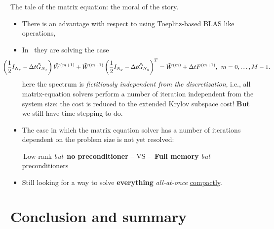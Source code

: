 \documentclass[aspectratio=169,xcolor=dvipsnames]{beamer}
\begin{document}
\begin{frame}{\Large The tale of the matrix equation: the moral of the story.}

\begin{itemize}
	\item[\faClock]<1-> There is an advantage with respect to using Toeplitz-based BLAS like operations,
	\item[\faForward]<2-> In~\parencite{MR3995304} they are solving the case
	\[\hspace{-3.2em}
	\left( \frac{1}{2} I_{N_x} - \Delta t \tilde{G}_{N_x} \right) \tilde{W}^{(m+1)} + \tilde{W}^{(m+1)} \left( \frac{1}{2} I_{N_y} - \Delta t \tilde{G}_{N_y} \right)^T = \tilde{W}^{(m)} + \Delta t F^{(m+1)}, \;\, m=0,\ldots,M-1.
	\]
	here the spectrum is \emph{fictitiously independent from the discretization}, i.e., all matrix-equation solvers perform a number of iteration independent from the system size: the cost is reduced to the extended Krylov subspace cost! \alert{\textbf{But}} we still have time-stepping to do.
	\item[\faQuestionCircle]<3-> The case in which the matrix equation solver has a number of iterations dependent on the problem size is not yet resolved:
	\begin{center}
		\faSmile\,Low-rank \emph{but} \alert{\textbf{\faSadCry\,no preconditioner}} -- VS -- \alert{\textbf{\faSadCry\,Full memory}} \emph{but} \faSmile\,preconditioners
	\end{center}
	\item[\faExclamation]<4-> Still looking for a way to solve \textbf{everything} \emph{all-at-once} \underline{compactly}. 
\end{itemize}

\end{frame}


\section{Conclusion and summary}
\end{document}
